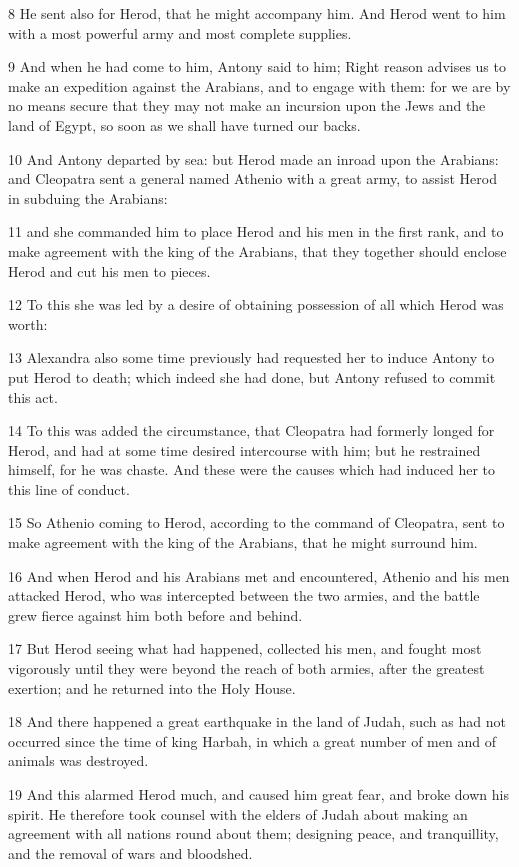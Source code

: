 8 He sent also for Herod, that he might accompany him. And Herod went to him with a most powerful army and most complete supplies. 

9 And when he had come to him, Antony said to him; Right reason advises us to make an expedition against the Arabians, and to engage with them: for we are by no means secure that they may not make an incursion upon the Jews and the land of Egypt, so soon as we shall have turned our backs. 

10 And Antony departed by sea: but Herod made an inroad upon the Arabians: and Cleopatra sent a general named Athenio with a great army, to assist Herod in subduing the Arabians: 

11 and she commanded him to place Herod and his men in the first rank, and to make agreement with the king of the Arabians, that they together should enclose Herod and cut his men to pieces. 

12 To this she was led by a desire of obtaining possession of all which Herod was worth: 

13 Alexandra also some time previously had requested her to induce Antony to put Herod to death; which indeed she had done, but Antony refused to commit this act. 

14 To this was added the circumstance, that Cleopatra had formerly longed for Herod, and had at some time desired intercourse with him; but he restrained himself, for he was chaste. And these were the causes which had induced her to this line of conduct. 

15 So Athenio coming to Herod, according to the command of Cleopatra, sent to make agreement with the king of the Arabians, that he might surround him. 

16 And when Herod and his Arabians met and encountered, Athenio and his men attacked Herod, who was intercepted between the two armies, and the battle grew fierce against him both before and behind. 

17 But Herod seeing what had happened, collected his men, and fought most vigorously until they were beyond the reach of both armies, after the greatest exertion; and he returned into the Holy House. 

18 And there happened a great earthquake in the land of Judah, such as had not occurred since the time of king Harbah, in which a great number of men and of animals was destroyed. 

19 And this alarmed Herod much, and caused him great fear, and broke down his spirit. He therefore took counsel with the elders of Judah about making an agreement with all nations round about them; designing peace, and tranquillity, and the removal of wars and bloodshed. 

